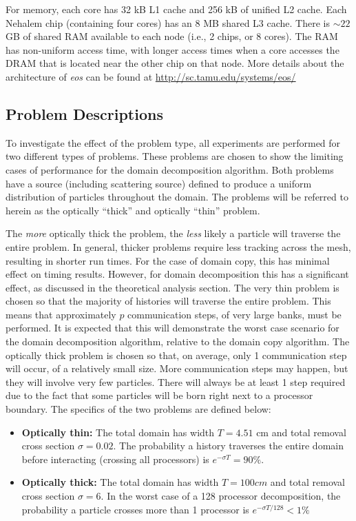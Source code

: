 \documentclass[12pt]{article}
\begin{document}
{{For memory, each core has 32 kB L1 cache and 256 kB of unified L2 cache. Each Nehalem
chip (containing four cores) has an 8 MB shared L3 cache.  There is $\sim 22$ GB of
shared RAM available to each node (i.e., 2 chips, or 8 cores). The RAM has non-uniform access time,
with longer access times when a core accesses the DRAM that is located near the other
chip on that node. More details about the architecture of \emph{eos} can be found
at \url{http://sc.tamu.edu/systems/eos/}

\subsection{Problem Descriptions}
    
To investigate the effect of the problem type, all experiments are performed for two
different types of problems. These problems are chosen to show the limiting cases of
performance for the domain decomposition algorithm.  Both problems have a source (including scattering
source) defined to produce a uniform distribution of particles throughout the domain. 
The problems will be referred to herein as the optically ``thick'' and optically
``thin'' problem.  

The \emph{more} optically thick the problem, the \emph{less} likely a particle will traverse the
entire problem. In general, thicker problems require less tracking across the mesh,
resulting in shorter run times.  For the case of domain copy, this has minimal effect
on timing results.  However, for domain decomposition this has a significant effect,
as discussed in the theoretical analysis section.
The very thin problem is chosen so that the majority of histories will traverse the
entire problem.  This means that approximately $p$ communication steps, of very
large banks, must be performed.  It is expected that this will demonstrate the worst case
scenario for the domain decomposition algorithm, relative to the domain copy
algorithm.  The optically thick problem is chosen so that, on average, only 1
communication step will occur, of a relatively small size.  More communication steps
may happen, but they will involve very few particles.  There will always be at least 1
step required due to the fact that some particles will be born right next to a
processor boundary.  The specifics of the two problems are defined below:  
\begin{itemize}
    \item \textbf{Optically thin:}  The total domain has width $T = 4.51$ cm
        and total removal cross section $\sigma = 0.02$. The probability a
        history traverses the entire domain before interacting (crossing all processors) is
        $e^{-\sigma T} = 90 \%$.
     \item \textbf{Optically thick:} The total domain has width $T = 100 cm$ and
         total removal cross section $\sigma = 6$. In the worst case of a 128
         processor decomposition, the probability a particle crosses more than 1
         processor is $e^{-\sigma T/128} < 1 \%$
\end{itemize}




}}
\end{document}
